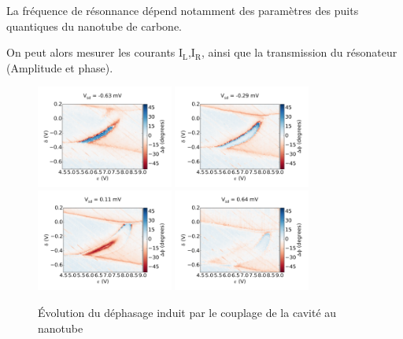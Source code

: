 La fréquence de résonnance dépend notamment des paramètres des puits quantiques du nanotube de carbone.

On peut alors mesurer les courants I$_\text{L}$,I$_\text{R}$, ainsi que la transmission du résonateur (Amplitude et phase).

\begin{figure}[h]
    \begin{center}
        \includegraphics[width=0.4\textwidth]{Images/Sweep/20150422_multigrayscale_DeltaEpsilon_001VsdmV_000__grayscale_phase}
        \includegraphics[width=0.4\textwidth]{Images/Sweep/20150422_multigrayscale_DeltaEpsilon_001VsdmV_010__grayscale_phase}
        \includegraphics[width=0.4\textwidth]{Images/Sweep/20150422_multigrayscale_DeltaEpsilon_001VsdmV_022__grayscale_phase}
        \includegraphics[width=0.4\textwidth]{Images/Sweep/20150422_multigrayscale_DeltaEpsilon_001VsdmV_038__grayscale_phase}
        \caption{Évolution du déphasage induit par le couplage de la cavité au nanotube}
        \label{expe_dephasage}
    \end{center}
\end{figure}

